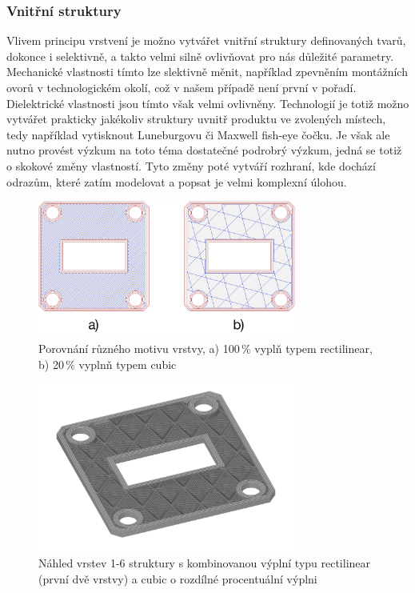 \subsubsection{Vnitřní struktury}
Vlivem principu vrstvení je možno vytvářet vnitřní struktury definovaných tvarů, dokonce i selektivně, a takto velmi silně ovlivňovat pro nás důležité parametry.
Mechanické vlastnosti tímto lze slektivně měnit, například zpevněním montážních ovorů v technologickém okolí, což v našem případě není první v pořadí.
Dielektrické vlastnosti jsou tímto však velmi ovlivněny. Technologií je totiž možno vytvářet prakticky jakékoliv struktury uvnitř produktu ve zvolených místech, tedy například vytisknout Luneburgovu či Maxwell fish-eye čočku. Je však ale nutno provést výzkum na toto téma dostatečné podrobrý výzkum, jedná se totiž o skokové změny vlastností. Tyto změny poté vytváří rozhraní, kde dochází odrazům, které zatím modelovat a popsat je velmi komplexní úlohou.

\begin{figure}[h]
\begin{center}
\includegraphics[width=8.5cm]{pics/fillcompare}
\caption{Porovnání různého motivu vrstvy, a) 100\,\% vyplň typem rectilinear, b) 20\,\% vyplnň typem cubic}
\end{center}
\end{figure}

\begin{figure}[h]
\begin{center}
\includegraphics[width=8.5cm]{pics/6layer}
\caption{Náhled vrstev 1-6 struktury s kombinovanou výplní typu rectilinear (první dvě vrstvy) a cubic o rozdílné procentuální výplni}
\end{center}
\end{figure}

